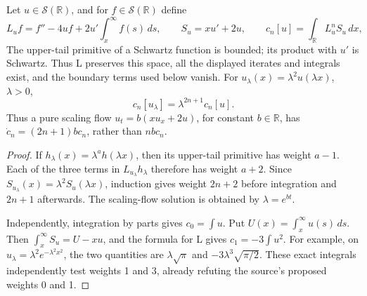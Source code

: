 \begin{proposition}\oursComputed
Let \(u\in\mathcal S(\mathbb R)\), and for
\(f\in\mathcal S(\mathbb R)\) define
\[
 L_u f=f''-4uf+2u'\int_x^\infty f(s)\,ds,\qquad
 S_u=xu'+2u,\qquad c_n[u]=\int_{\mathbb R}L_u^n S_u\,dx,
\]
The upper-tail primitive of a Schwartz function is bounded; its
product with \(u'\) is Schwartz. Thus L preserves this space,
all the displayed iterates and integrals exist, and the boundary
terms used below vanish.
For \(u_\lambda(x)=\lambda^2u(\lambda x)\), \(\lambda>0\),
\[
 c_n[u_\lambda]=\lambda^{2n+1}c_n[u].
\]
Thus a pure scaling flow \(u_t=b(xu_x+2u)\), for constant \(b\in\mathbb R\),
has \(\dot c_n=(2n+1)bc_n\), rather than \(nbc_n\).
\end{proposition}
\begin{proof}
If \(h_\lambda(x)=\lambda^a h(\lambda x)\), then its upper-tail
primitive has weight \(a-1\). Each of the three terms in
\(L_{u_\lambda}h_\lambda\) therefore has weight \(a+2\). Since
\(S_{u_\lambda}(x)=\lambda^2S_u(\lambda x)\), induction gives
weight \(2n+2\) before integration and \(2n+1\) afterwards.
The scaling-flow solution is obtained by \(\lambda=e^{bt}\).

Independently, integration by parts gives \(c_0=\int u\).
Put \(U(x)=\int_x^\infty u(s)\,ds\). Then
\(\int_x^\infty S_u=U-xu\), and the formula for L gives
\(c_1=-3\int u^2\). For example, on
\(u_\lambda=\lambda^2e^{-\lambda^2x^2}\), the two quantities are
\(\lambda\sqrt\pi\) and \(-3\lambda^3\sqrt{\pi/2}\).
These exact integrals independently test weights 1 and 3, already
refuting the source's proposed weights 0 and 1.
\end{proof}

